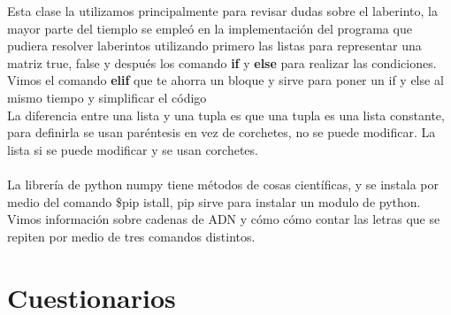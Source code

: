 \documentclass{book}
\begin{document}
	Esta clase la utilizamos principalmente para revisar dudas sobre el laberinto, la mayor parte del tiemplo se empleó en la implementación del programa que pudiera resolver laberintos utilizando primero las listas para representar una matriz true, false y después los comando \textbf{if} y \textbf{else} para realizar las condiciones. Vimos el comando \textbf{elif} que te ahorra un bloque y sirve para poner un if y else al mismo tiempo y simplificar el código \\
	La diferencia entre una lista y una tupla es que una tupla es una lista constante, para definirla se usan paréntesis en vez de corchetes, no se puede modificar. La lista si se puede modificar y se usan corchetes.\\
	\\
	La librería de python numpy tiene métodos de cosas científicas, y se instala por medio del comando \$pip istall,  pip sirve para instalar un modulo de python.
	Vimos información sobre cadenas de ADN y cómo cómo contar las letras que se repiten por medio de tres comandos distintos.
	
	
	
	\chapter{Cuestionarios}
\end{document}
